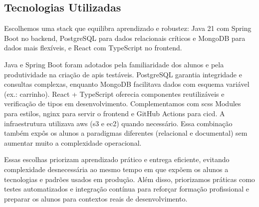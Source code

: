 \subsection{Tecnologias Utilizadas}
  Escolhemos uma stack que equilibra aprendizado e robustez: Java 21 \cite{java} com Spring Boot \cite{springboot} no backend, PostgreSQL \cite{postgresql} para dados relacionais críticos e MongoDB \cite{mongodb} para dados mais flexíveis, e React com TypeScript \cite{react,typescript} no frontend.

Java e Spring Boot foram adotados pela familiaridade dos alunos e pela produtividade na criação de \ac{api}s testáveis. PostgreSQL garantia integridade e consultas complexas, enquanto MongoDB facilitava dados com esquema variável (ex.: carrinho). React + TypeScript oferecia componentes reutilizáveis e verificação de tipos em desenvolvimento. Complementamos com \ac{scss} Modules para estilos, \ac{nginx} para servir o frontend e GitHub Actions para \ac{cicd}. A infraestrutura utilizava \ac{aws} \cite{aws} (\ac{s3} e \ac{ec2}) quando necessário. Essa combinação também expôs os alunos a paradigmas diferentes (relacional e documental) sem aumentar muito a complexidade operacional.

  Essas escolhas priorizam aprendizado prático e entrega eficiente, evitando complexidade desnecessária ao mesmo tempo em que expõem os alunos a tecnologias e padrões usados em produção. Além disso, priorizamos práticas como testes automatizados e integração contínua para reforçar formação profissional e preparar os alunos para contextos reais de desenvolvimento.


  
